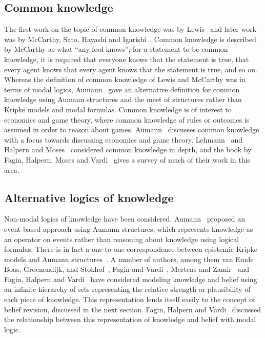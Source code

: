 \subsection{Common knowledge}

The first work on the topic of common knowledge was by Lewis~\cite{lewis:1969} and later work was by McCarthy, Sato, Hayashi and Igarishi~\cite{mccarthy:1979}.
Common knowledge is described by McCarthy as what ``any fool knows''; for a statement to be common knowledge, it is required that everyone knows that the statement is true, that every agent knows that every agent knows that the statement is true, and so on.
Whereas the definition of common knowledge of Lewis and McCarthy was in terms of modal logics, Aumann~\cite{aumann:1976} gave an alternative definition for common knowledge using Aumann structures and the meet of structures rather than Kripke models and modal formulas.
Common knowledge is of interest to economics and game theory, where common knowledge of rules or outcomes is assumed in order to reason about games. 
Aumann~\cite{aumann:1976} discusses common knowledge with a focus towards discussing economics and game theory. 
Lehmann~\cite{lehmann:1984} and Halpern and Moses~\cite{halpern:1985} considered common knowledge in depth, and the book by Fagin, Halpern, Moses and Vardi~\cite{fagin:1995} gives a survey of much of their work in this area.

\subsection{Alternative logics of knowledge}

Non-modal logics of knowledge have been considered. 
Aumann~\cite{aumann:1976} proposed an event-based approach using Aumann structures, which represents knowledge as an operator on events rather than reasoning about knowledge using logical formulas.
There is in fact a one-to-one correspondence between epistemic Kripke models and Aumann structures~\cite{fagin:1995}.
A number of authors, among them van Emde Boas, Groenendijk, and Stokhof~\cite{vanemdeboas:1980}, Fagin and Vardi~\cite{fagin:1985}, Mertens and Zamir~\cite{mertens:1985} and Fagin, Halpern and Vardi~\cite{fagin:1991} have considered modeling knowledge and belief using an infinite hierarchy of sets representing the relative strength or plausibility of each piece of knowledge.
This representation lends itself easily to the concept of belief revision, discussed in the next section.
Fagin, Halpern and Vardi~\cite{fagin:1991} discussed the relationship between this representation of knowledge and belief with modal logic.  

